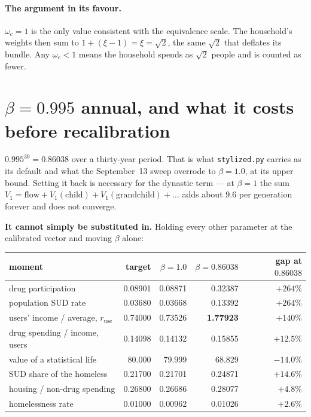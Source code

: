 \documentclass[11pt]{article}
\begin{document}
\paragraph{The argument in its favour.} $\omega_c=1$ is the only value
consistent with the equivalence scale. The household's weights then sum to
$1+(\xi-1)=\xi=\sqrt2$, the same $\sqrt2$ that deflates its bundle. Any
$\omega_c<1$ means the household spends as $\sqrt2$ people and is counted as
fewer.

\section{$\beta=0.995$ annual, and what it costs before recalibration}

$0.995^{30}=0.86038$ over a thirty-year period. That is what
\texttt{stylized.py} carries as its default and what the September~13 sweep
overrode to $\beta=1.0$, at its upper bound. Setting it back is necessary for
the dynastic term --- at $\beta=1$ the sum $V_1=\text{flow}+V_1(\text{child})
+V_1(\text{grandchild})+\dots$ adds about $9.6$ per generation forever and does
not converge.

\textbf{It cannot simply be substituted in.} Holding every other parameter at
the calibrated vector and moving $\beta$ alone:

\medskip
\begin{tabular}{@{}lrrrr@{}}
\toprule
moment & target & $\beta=1.0$ & $\beta=0.86038$ & gap at $0.86038$\\
\midrule
drug participation            & 0.08901 & 0.08871 & 0.32387 & $+264\%$\\
population SUD rate           & 0.03680 & 0.03668 & 0.13392 & $+264\%$\\
users' income / average, $r_{\text{use}}$ & 0.74000 & 0.73526 & \textbf{1.77923} & $+140\%$\\
drug spending / income, users & 0.14098 & 0.14132 & 0.15855 & $+12.5\%$\\
value of a statistical life   & 80.000  & 79.999  & 68.829  & $-14.0\%$\\
SUD share of the homeless     & 0.21700 & 0.21701 & 0.24871 & $+14.6\%$\\
housing / non-drug spending   & 0.26800 & 0.26686 & 0.28077 & $+4.8\%$\\
homelessness rate             & 0.01000 & 0.00962 & 0.01026 & $+2.6\%$\\
\bottomrule
\end{tabular}
\end{document}
